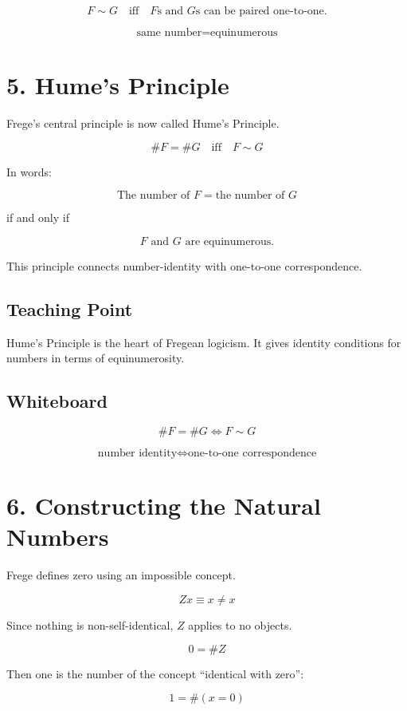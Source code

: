 \documentclass[11pt]{article}
\begin{document}
\[
F \sim G
\quad \text{iff}
\quad
F\text{s and }G\text{s can be paired one-to-one.}
\]

\[
\text{same number}
=
\text{equinumerous}
\]

\section*{5. Hume's Principle}

Frege's central principle is now called Hume's Principle.

\[
\boxed{
\#F = \#G
\quad \text{iff}
\quad
F \sim G
}
\]

In words:

\[
\text{The number of }F = \text{the number of }G
\]

if and only if

\[
F \text{ and } G \text{ are equinumerous.}
\]

This principle connects number-identity with one-to-one correspondence.

\subsection*{Teaching Point}

Hume's Principle is the heart of Fregean logicism. It gives identity conditions for numbers
in terms of equinumerosity.

\subsection*{Whiteboard}

\[
\#F = \#G
\Longleftrightarrow
F \sim G
\]

\[
\text{number identity}
\Longleftrightarrow
\text{one-to-one correspondence}
\]

\section*{6. Constructing the Natural Numbers}

Frege defines zero using an impossible concept.

\[
Zx \equiv x \neq x
\]

Since nothing is non-self-identical, \(Z\) applies to no objects.

\[
0 = \#Z
\]

Then one is the number of the concept ``identical with zero'':

\[
1 = \#(x=0)
\]
\end{document}
